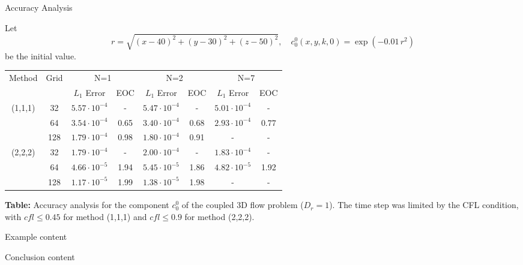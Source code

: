    \begin{frame}{Accuracy Analysis}
    	\scriptsize
    	
    	Let 
    	\[
    	r = \sqrt{(x-40)^2+(y-30)^2+(z-50)^2}, \quad
    	c^0_0(x, y, k, 0) = \exp(-0.01 \, r^2)
    	\] 
    	be the initial value.
    	
    	\medskip
    	\centering
    	\begin{tabular}{|c|c|c|c|c|c|c|c|}
    		\hline
    		Method & Grid & \multicolumn{2}{c|}{N=1} & \multicolumn{2}{c|}{N=2} & \multicolumn{2}{c|}{N=7} \\
    		\cline{3-8}
    		&  & $L_1$ Error & EOC & $L_1$ Error & EOC & $L_1$ Error & EOC \\
    		\hline
    		(1,1,1) & 32  & $5.57\cdot10^{-4}$ & -    & $5.47\cdot10^{-4}$ & -    & $5.01 \cdot10^{-4} $ & - \\
    		& 64  & $3.54\cdot10^{-4}$ & 0.65 & $3.40\cdot10^{-4}$ & 0.68 & $2.93\cdot10^{-4}$ & $0.77$ \\
    		& 128 & $1.79\cdot10^{-4}$ & 0.98 & $1.80\cdot10^{-4}$ & 0.91 & - & - \\
    		\hline
    		(2,2,2) & 32  & $1.79\cdot10^{-4}$ & -    & $2.00\cdot10^{-4}$ & -    & $1.83\cdot10^{-4}$ & - \\
    		& 64  & $4.66\cdot10^{-5}$ & 1.94 & $5.45\cdot10^{-5}$ & 1.86 & $4.82\cdot10^{-5}$ & 1.92 \\
    		& 128 & $1.17\cdot10^{-5}$ & 1.99 & $1.38\cdot10^{-5}$ & 1.98 & - & - \\
    		\hline
    	\end{tabular}
    	
    	\vspace{0.5em}
    	\footnotesize{
    		\textbf{Table:} Accuracy analysis for the component $c^0_0$ of the coupled 3D flow problem ($D_r=1$). The time step was limited by the CFL condition, with $cfl \le 0.45$ for method (1,1,1) and $cfl \le 0.9$ for method (2,2,2).  
    	}
    \end{frame}
    
    \begin{frame}{Example}
    	content
    \end{frame}
    
    
    \begin{frame}{Conclusion}
 content
    \end{frame}

